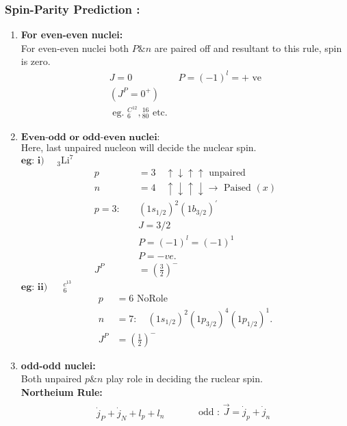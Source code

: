\subsubsection{Spin-Parity Prediction :}
\begin{enumerate}[label=\alph*)]
	\item \textbf{For even-even nuclei:}\\ For even-even nuclei both $P \& n$ are paired off and resultant to this rule, spin is zero.
	\begin{align*}
	J=0 \quad &P=(-1)^{l}=\text {+ ve}\\
	\left(J^{P}=0^{+}\right)&\\
	\text { eg. }{ }_{6}^{C^{12}}, {}_80^{16} \text { etc. }
	\end{align*}
	\item $\textbf{Even-odd or odd-even nuclei:}$\\
	Here, last unpaired nucleon will decide the nuclear spin.\\
	$\textbf{eg: i) }\quad $${ }_{3} \mathrm{Li}^{7}$
	\begin{align*}
	p&=3 \quad \uparrow \downarrow \uparrow \uparrow \text { unpaired }\\
	n&=4 \quad \uparrow \downarrow \uparrow \downarrow \rightarrow \text { Paised }(x)\\
	p=3: \quad&\left(1 s_{1 / 2}\right)^{2}\left(1 b_{3 / 2}\right)^{\prime}\\
	&J=3 / 2 \\
	&P=(-1)^{l}=(-1)^{1} \\
	&P=-v e .\\
J^{P}&=\left(\frac{3}{2}\right)^{-}
	\end{align*}
$\textbf{eg: ii) }\quad$ ${ }_{6}^{c^{13}}$
\begin{align*}
p&=6 \text { NoRole }\\
n&=7: \quad\left(1 s_{1 / 2}\right)^{2}\left(1 p_{3 / 2}\right)^{4}\left(1 p_{1 / 2}\right)^{1} .\\
J^{P}&=\left(\frac{1}{2}\right)^{-}
\end{align*}
\item \textbf{odd-odd nuclei:}\\
Both unpaired $p \& n$ play role in deciding the ruclear spin.\\
\textbf{Northeium Rule:}
\begin{align*}
\dot{j}_{P}+\dot{j}_{N}+l_{p}+l_{n}\qquad &
\begin{array}{ll}
\text { odd : } \vec{J}=\dot{j}_{p}+\dot{j}_{n}\\

\end{array}
\end{align*}$$
\end{enumerate}
